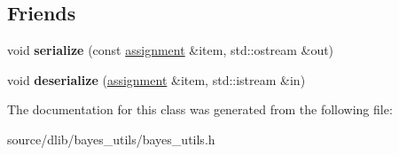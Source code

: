 \subsection*{Friends}
\begin{DoxyCompactItemize}
\item 
\hypertarget{classdlib_1_1assignment_ad9af354e7caed6401c9fad702aff05e1}{
void {\bfseries serialize} (const \hyperlink{classdlib_1_1assignment}{assignment} \&item, std::ostream \&out)}
\label{classdlib_1_1assignment_ad9af354e7caed6401c9fad702aff05e1}

\item 
\hypertarget{classdlib_1_1assignment_a7d9bcb8be8dbcdbfa3b14d8f434aacad}{
void {\bfseries deserialize} (\hyperlink{classdlib_1_1assignment}{assignment} \&item, std::istream \&in)}
\label{classdlib_1_1assignment_a7d9bcb8be8dbcdbfa3b14d8f434aacad}

\end{DoxyCompactItemize}


The documentation for this class was generated from the following file:\begin{DoxyCompactItemize}
\item 
source/dlib/bayes\_\-utils/bayes\_\-utils.h\end{DoxyCompactItemize}
